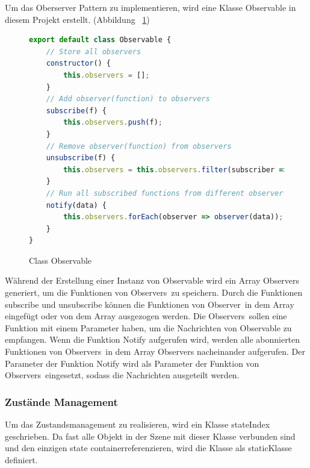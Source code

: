   Um das Oberserver Pattern zu implementieren, wird eine Klasse {\selectfont Observable} in diesem Projekt erstellt. (Abbildung ~\ref{fig:observable})
  
\begin{figure}[ht]
\vspace*{1em}
\centering
\caption[Class Observable]{Class Observable}
\begin{lstlisting}[language=JavaScript, style=htmlcssjs]
export default class Observable {
    // Store all observers
    constructor() {
        this.observers = [];
    }
    // Add observer(function) to observers
    subscribe(f) {
        this.observers.push(f);
    }
    // Remove observer(function) from observers
    unsubscribe(f) {
        this.observers = this.observers.filter(subscriber => subscriber !== f);
    }
    // Run all subscribed functions from different observer
    notify(data) {
        this.observers.forEach(observer => observer(data));
    }
}
\end{lstlisting}
\label{fig:observable} 
\end{figure}
  Während der Erstellung einer Instanz von {\selectfont Observable} wird ein Array {\selectfont Observers} generiert, um die Funktionen von \glqq Observers\grqq\ zu speichern. Durch die Funktionen {\selectfont subscribe} und {\selectfont unsubscribe} können die Funktionen von \glqq Observer\grqq\ in dem Array eingefügt oder von dem Array ausgezogen werden. Die \glqq Observers\grqq\ sollen eine Funktion mit einem Parameter haben, um die Nachrichten von {\selectfont Observable} zu empfangen. Wenn die Funktion {\selectfont Notify} aufgerufen wird, werden alle abonnierten Funktionen von \glqq Observers\grqq\ in dem Array {\selectfont Observers} nacheinander aufgerufen. Der Parameter der Funktion {\selectfont Notify} wird als Parameter der Funktion von \glqq Observers\grqq\ eingesetzt, sodass die Nachrichten ausgeteilt werden.
  
  \subsubsection{Zustände Management}
  
  Um das Zustandsmanagement zu realisieren, wird ein Klasse {\selectfont stateIndex} geschrieben. Da fast alle Objekt in der Szene mit dieser Klasse verbunden sind und den einzigen \glqq state container\grqq referenzieren, wird die Klasse als \glqq static\grqq Klasse definiert.
  
